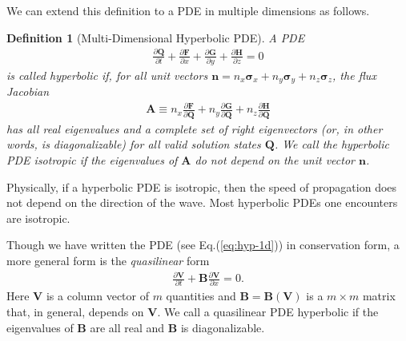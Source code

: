 \documentclass[12pt]{article}
\newtheorem{definition}{Definition}
\theoremstyle{definition}
\theoremstyle{definition}
\theoremstyle{definition}
\newcommand{\eqr}[1]{Eq.\thinspace(#1)}
\newcommand{\pfrac}[2]{\frac{\partial #1}{\partial #2}}
\newcommand{\mvec}[1]{\mathbf{#1}}
\newcommand{\gvec}[1]{\boldsymbol{#1}}
\newcommand{\cbas}[1]{\gvec{\sigma}_{#1}}
\begin{document}
We can extend this definition to a PDE in multiple dimensions as
follows.
\begin{definition}[Multi-Dimensional Hyperbolic PDE]
  A PDE
  \begin{align*}
    \pfrac{\mvec{Q}}{t} 
    + \pfrac{\mvec{F}}{x}
    + \pfrac{\mvec{G}}{y}
    + \pfrac{\mvec{H}}{z} = 0
  \end{align*}
  is called \emph{hyperbolic} if, for all unit vectors
  $\mvec{n} = n_x \cbas{x} + n_y \cbas{y} + n_z \cbas{z}$, the flux
  Jacobian
  \begin{align*}
    \mvec{A} \equiv 
    n_x \pfrac{\mvec{F}}{\mvec{Q}}
    + n_y \pfrac{\mvec{G}}{\mvec{Q}}
    + n_z \pfrac{\mvec{H}}{\mvec{Q}}
  \end{align*}
  has all real eigenvalues and a complete set of right eigenvectors
  (or, in other words, is diagonalizable) for all valid solution
  states $\mvec{Q}$. We call the hyperbolic PDE \emph{isotropic} if
  the eigenvalues of $\mvec{A}$ do not depend on the unit vector
  $\mvec{n}$.
\end{definition}

Physically, if a hyperbolic PDE is isotropic, then the speed of
propagation does not depend on the direction of the wave. Most
hyperbolic PDEs one encounters are isotropic.

Though we have written the PDE (see \eqr{\ref{eq:hyp-1d}}) in
conservation form, a more general form is the \emph{quasilinear} form
\begin{align}
  \pfrac{\mvec{V}}{t} + \mvec{B}\pfrac{\mvec{V}}{x} = 0.
  \label{eq:ql-hyp-1d}
\end{align}
Here $\mvec{V}$ is a column vector of $m$ quantities and
$\mvec{B} = \mvec{B}(\mvec{V})$ is a $m\times m$ matrix that, in
general, depends on $\mvec{V}$. We call a quasilinear PDE hyperbolic
if the eigenvalues of $\mvec{B}$ are all real and $\mvec{B}$ is
diagonalizable. 
\end{document}
